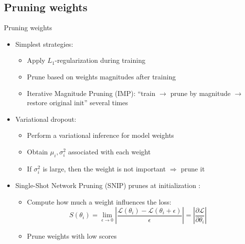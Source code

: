 \documentclass[10pt, handout]{beamer}
\begin{document}
\subsection{Pruning weights}
\begin{frame}{Pruning weights}
\begin{itemize}
    \pause\item Simplest strategies:
    \begin{itemize}
        \pause\item Apply $L_1$-regularization during training
        \pause\item Prune based on weights magnitudes after training
        \pause\item Iterative Magnitude Pruning (IMP): ``train $\to$ prune by magnitude $\to$ restore original init'' several times
    \end{itemize}
    \pause\item Variational dropout:
    \begin{itemize}
        \pause\item Perform a variational inference for model weights
        \pause\item Obtain $\mu_i, \sigma_i^2$ associated with each weight
        \pause\item If $\sigma_i^2$ is large, then the weight is not important $\Rightarrow$ prune it
    \end{itemize}
    \pause\item Single-Shot Network Pruning (SNIP) prunes at initialization \cite{SNIP}:
    \begin{itemize}
        \pause\item Compute how much a weight influences the loss:
        \begin{equation}
S\left(\theta_{i}\right)=\lim _{\epsilon \rightarrow 0}\left|\frac{\mathcal{L}\left(\theta_{i}\right)-\mathcal{L}\left(\theta_{i}+\epsilon \right)}{\epsilon}\right|=\left|\frac{\partial \mathcal{L}}{\partial \theta_{i}}\right|
\end{equation}
        \pause\item Prune weights with low scores
    \end{itemize}
\end{itemize}
\end{frame}
\end{document}
